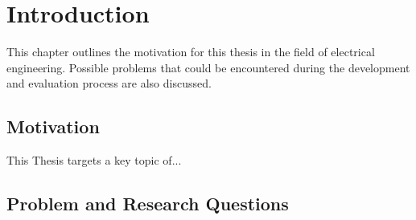 \chapter{Introduction}
\label{Chapter::Introduction}
This chapter outlines the motivation for this thesis in the field of electrical engineering. Possible problems that could be encountered during the development and evaluation process are also discussed.

\section{Motivation}
\label{Section::Motivation}
This Thesis targets a key topic of...

\section{Problem and Research Questions}
\label{Section::Problem_and_Research_Questions}